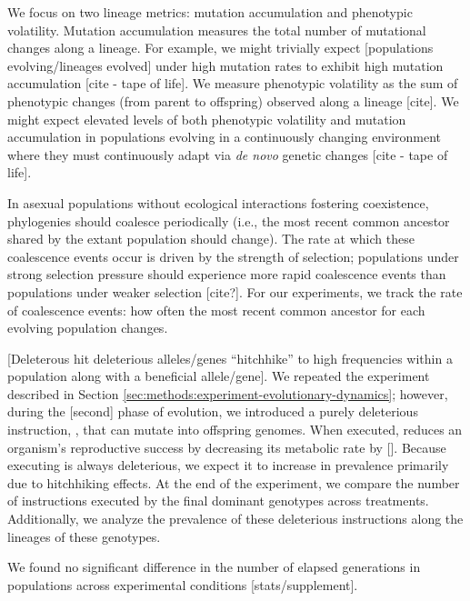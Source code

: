 We focus on two lineage metrics: mutation accumulation and phenotypic volatility.
Mutation accumulation measures the total number of mutational changes along a lineage.
For example, we might trivially expect [populations evolving/lineages evolved] under high mutation rates to exhibit high mutation accumulation [cite - tape of life].
We measure phenotypic volatility as the sum of phenotypic changes (from parent to offspring) observed along a lineage [cite].
We might expect elevated levels of both phenotypic volatility and mutation accumulation in populations evolving in a continuously changing environment where they must continuously adapt via \textit{de novo} genetic changes [cite - tape of life].

In asexual populations without ecological interactions fostering coexistence, phylogenies should coalesce periodically (i.e., the most recent common ancestor shared by the extant population should change).
The rate at which these coalescence events occur is driven by the strength of selection; populations under strong selection pressure should experience more rapid coalescence events than populations under weaker selection [cite?].
For our experiments, we track the rate of coalescence events: how often the most recent common ancestor for each evolving population changes.



[Deleterous hit deleterious alleles/genes ``hitchhike'' to high frequencies within a population along with a beneficial allele/gene].
We repeated the experiment described in Section \ref{sec:methods:experiment-evolutionary-dynamics}; however, during the [second] phase of evolution, we introduced a purely deleterious instruction, , that can mutate into offspring genomes.
When executed,  reduces an organism's reproductive success by decreasing its metabolic rate by [\instPoisonMagnitude].
Because executing  is always deleterious, we expect it to increase in prevalence primarily due to hitchhiking effects.
At the end of the experiment, we compare the number of  instructions executed by the final dominant genotypes across treatments.
Additionally, we analyze the prevalence of these deleterious instructions along the lineages of these genotypes.

We found no significant difference in the number of elapsed generations in populations across experimental conditions [stats/supplement].


